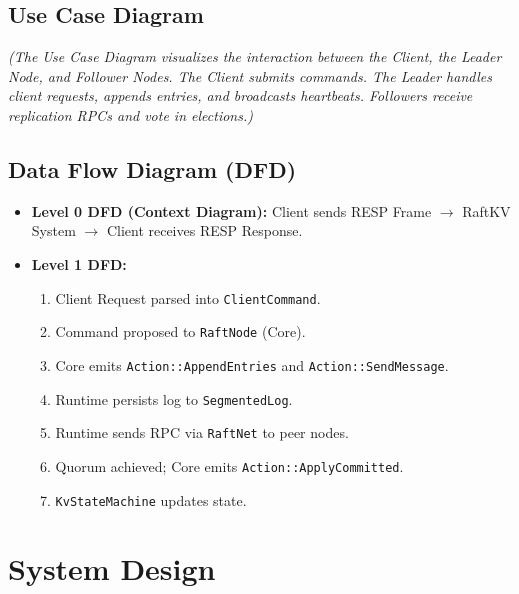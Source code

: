 \documentclass[12pt,a4paper]{report}
\begin{document}
\section{Use Case Diagram}
\textit{(The Use Case Diagram visualizes the interaction between the Client, the Leader Node, and Follower Nodes. The Client submits commands. The Leader handles client requests, appends entries, and broadcasts heartbeats. Followers receive replication RPCs and vote in elections.)}

\section{Data Flow Diagram (DFD)}
\begin{itemize}
    \item \textbf{Level 0 DFD (Context Diagram):} Client sends RESP Frame $\rightarrow$ RaftKV System $\rightarrow$ Client receives RESP Response.
    \item \textbf{Level 1 DFD:} 
    \begin{enumerate}
        \item Client Request parsed into \texttt{ClientCommand}.
        \item Command proposed to \texttt{RaftNode} (Core).
        \item Core emits \texttt{Action::AppendEntries} and \texttt{Action::SendMessage}.
        \item Runtime persists log to \texttt{SegmentedLog}.
        \item Runtime sends RPC via \texttt{RaftNet} to peer nodes.
        \item Quorum achieved; Core emits \texttt{Action::ApplyCommitted}.
        \item \texttt{KvStateMachine} updates state.
    \end{enumerate}
\end{itemize}


\chapter{System Design}
\end{document}
